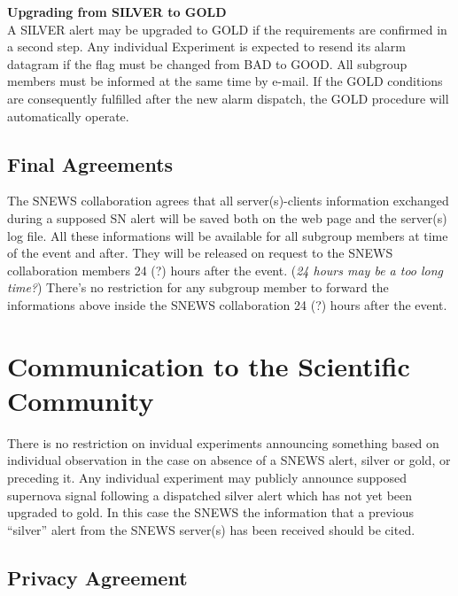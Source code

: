 \documentclass{article}
\begin{document}
\textbf{Upgrading from SILVER to GOLD}\\
A SILVER alert may be upgraded to GOLD if the requirements are
confirmed in a second step. Any individual Experiment is expected to
resend its alarm datagram if the flag must be changed from BAD to
GOOD. All subgroup members must be informed at the same time by
e-mail. If the GOLD conditions are consequently fulfilled after the
new alarm dispatch, the GOLD procedure will automatically operate.

\subsection{Final Agreements}

The SNEWS collaboration agrees that all server(s)-clients information
exchanged during a supposed SN alert will be saved both on the web page
and the server(s) log file. All these informations will be available
for all subgroup members at time of the event and after. They will be
released on request to the SNEWS collaboration members 24 (?) hours
after the event.  ({\it 24 hours may be a too long time?})  There's no
restriction for any subgroup member to forward the informations above
inside the SNEWS collaboration 24 (?) hours after the event.


\section{Communication to the Scientific Community}
There is no restriction on invidual experiments announcing something
based on individual observation in the case on absence of a SNEWS
alert, silver or gold, or preceding it.  Any individual experiment may
publicly announce supposed supernova signal following a dispatched
silver alert which has not yet been upgraded to gold.  In this case
the SNEWS the information that a previous ``silver'' alert from the
SNEWS server(s) has been received should be cited.
                                         
\subsection{Privacy Agreement}
                                     
\end{document}
